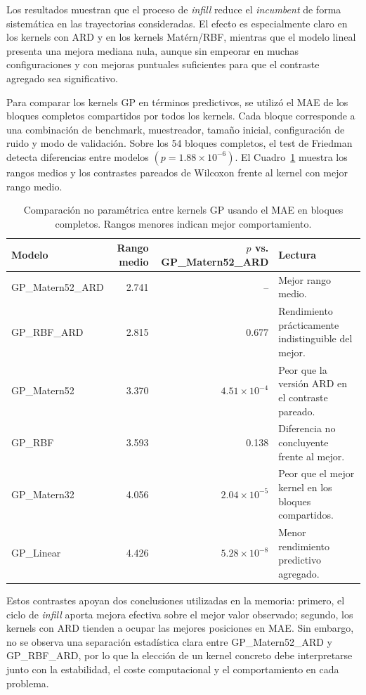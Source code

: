Los resultados muestran que el proceso de \emph{infill} reduce el \emph{incumbent} de forma sistemática en las trayectorias consideradas. El efecto es especialmente claro en los kernels con ARD y en los kernels Matérn/RBF, mientras que el modelo lineal presenta una mejora mediana nula, aunque sin empeorar en muchas configuraciones y con mejoras puntuales suficientes para que el contraste agregado sea significativo.

Para comparar los kernels GP en términos predictivos, se utilizó el MAE de los bloques completos compartidos por todos los kernels. Cada bloque corresponde a una combinación de benchmark, muestreador, tamaño inicial, configuración de ruido y modo de validación. Sobre los 54 bloques completos, el test de Friedman detecta diferencias entre modelos \((p=1.88\times10^{-6})\). El Cuadro~\ref{tab:app_friedman_kernels_gp} muestra los rangos medios y los contrastes pareados de Wilcoxon frente al kernel con mejor rango medio.

\begin{table}[htbp]
\centering
\small
\caption[Contraste entre kernels GP en benchmarks]{Comparación no paramétrica entre kernels GP usando el MAE en bloques completos. Rangos menores indican mejor comportamiento.}
\label{tab:app_friedman_kernels_gp}
\renewcommand{\arraystretch}{1.15}
\begin{tabularx}{\textwidth}{@{}l r r X@{}}
\toprule
\textbf{Modelo} & \textbf{Rango medio} & \textbf{\(p\) vs. GP\_Matern52\_ARD} & \textbf{Lectura} \\
\midrule
GP\_Matern52\_ARD & 2.741 & -- & Mejor rango medio. \\
GP\_RBF\_ARD & 2.815 & 0.677 & Rendimiento prácticamente indistinguible del mejor. \\
GP\_Matern52 & 3.370 & \(4.51\times10^{-4}\) & Peor que la versión ARD en el contraste pareado. \\
GP\_RBF & 3.593 & 0.138 & Diferencia no concluyente frente al mejor. \\
GP\_Matern32 & 4.056 & \(2.04\times10^{-5}\) & Peor que el mejor kernel en los bloques compartidos. \\
GP\_Linear & 4.426 & \(5.28\times10^{-8}\) & Menor rendimiento predictivo agregado. \\
\bottomrule
\end{tabularx}
\end{table}
\FloatBarrier

Estos contrastes apoyan dos conclusiones utilizadas en la memoria: primero, el ciclo de \emph{infill} aporta mejora efectiva sobre el mejor valor observado; segundo, los kernels con ARD tienden a ocupar las mejores posiciones en MAE. Sin embargo, no se observa una separación estadística clara entre GP\_Matern52\_ARD y GP\_RBF\_ARD, por lo que la elección de un kernel concreto debe interpretarse junto con la estabilidad, el coste computacional y el comportamiento en cada problema.
